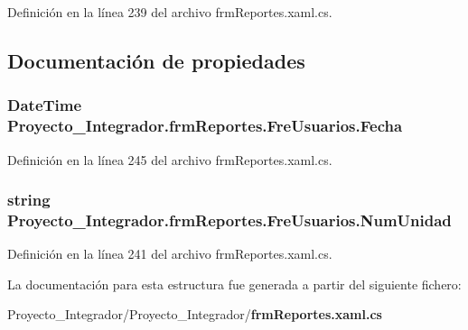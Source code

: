 Definición en la línea 239 del archivo frm\-Reportes.\-xaml.\-cs.



\subsection{Documentación de propiedades}
\subsubsection[{Fecha}]{\setlength{\rightskip}{0pt plus 5cm}Date\-Time Proyecto\-\_\-\-Integrador.\-frm\-Reportes.\-Fre\-Usuarios.\-Fecha\hspace{0.3cm}{\ttfamily [get]}}\label{struct_proyecto___integrador_1_1frm_reportes_1_1_fre_usuarios_aac1346c33caee57f5df73cb2d80721f0}


Definición en la línea 245 del archivo frm\-Reportes.\-xaml.\-cs.

\subsubsection[{Num\-Unidad}]{\setlength{\rightskip}{0pt plus 5cm}string Proyecto\-\_\-\-Integrador.\-frm\-Reportes.\-Fre\-Usuarios.\-Num\-Unidad\hspace{0.3cm}{\ttfamily [get]}}\label{struct_proyecto___integrador_1_1frm_reportes_1_1_fre_usuarios_a537175fdb29fcfce19c25feb7d57b820}


Definición en la línea 241 del archivo frm\-Reportes.\-xaml.\-cs.



La documentación para esta estructura fue generada a partir del siguiente fichero\-:\begin{DoxyCompactItemize}
\item 
Proyecto\-\_\-\-Integrador/\-Proyecto\-\_\-\-Integrador/{\bf frm\-Reportes.\-xaml.\-cs}\end{DoxyCompactItemize}
